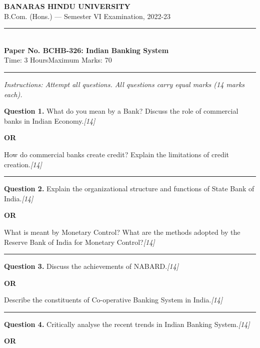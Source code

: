 \documentclass[11pt,a4paper]{article}
\newcommand{\pts}[1]{\hfill   \textit{[#1]}}
\begin{document}
\begin{center}
  {\large\bfseries BANARAS HINDU UNIVERSITY}\\[2pt]
  {\normalsize B.Com. (Hons.) --- Semester VI Examination, 2022-23}\\[6pt]
  \rule{0.8\linewidth}{0.5pt}\\[6pt]
  {\large\bfseries Paper No. BCHB-326: Indian Banking System}\\[4pt]
  {\normalsize Time: 3 Hours\hfill Maximum Marks: 70}
\end{center}

\rule{\linewidth}{0.4pt}

\smallskip



\noindent   \textit{Instructions: Attempt all questions. All questions carry equal marks (14 marks each).}

\bigskip




\noindent   \textbf{Question 1.}
What do you mean by a Bank? Discuss the role of commercial banks in Indian Economy.\pts{14}

\centerline{   \textbf{OR}}

How do commercial banks create credit? Explain the limitations of credit creation.\pts{14}

\medskip\rule{\linewidth}{0.2pt}




\noindent   \textbf{Question 2.}
Explain the organizational structure and functions of State Bank of India.\pts{14}

\centerline{   \textbf{OR}}

What is meant by Monetary Control? What are the methods adopted by the Reserve Bank of India for Monetary Control?\pts{14}

\medskip\rule{\linewidth}{0.2pt}




\noindent   \textbf{Question 3.}
Discuss the achievements of NABARD.\pts{14}

\centerline{   \textbf{OR}}

Describe the constituents of Co-operative Banking System in India.\pts{14}

\medskip\rule{\linewidth}{0.2pt}




\noindent   \textbf{Question 4.}
Critically analyse the recent trends in Indian Banking System.\pts{14}

\centerline{   \textbf{OR}}
\end{document}
